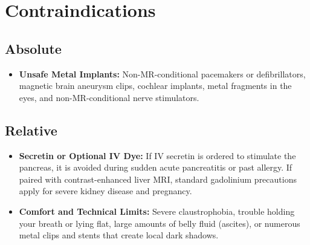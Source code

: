 \section{Contraindications}

\subsection{Absolute}
\begin{itemize}
\item \textbf{Unsafe Metal Implants:} Non-MR-conditional pacemakers or defibrillators, magnetic brain aneurysm clips, cochlear implants, metal fragments in the eyes, and non-MR-conditional nerve stimulators.
\end{itemize}

\subsection{Relative}
\begin{itemize}
\item \textbf{Secretin or Optional IV Dye:} If IV secretin is ordered to stimulate the pancreas, it is avoided during sudden acute pancreatitis or past allergy. If paired with contrast-enhanced liver MRI, standard gadolinium precautions apply for severe kidney disease and pregnancy.
\item \textbf{Comfort and Technical Limits:} Severe claustrophobia, trouble holding your breath or lying flat, large amounts of belly fluid (ascites), or numerous metal clips and stents that create local dark shadows.
\end{itemize}

